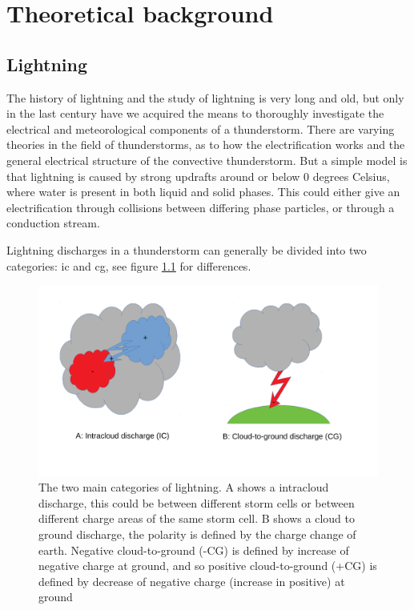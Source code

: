 \setcounter{chapter}{1} 

\chapter{Theoretical background}

\section{Lightning}
The history of lightning and the study of lightning is very long and old, but only in the last century have we acquired the means to thoroughly investigate the electrical and meteorological components of a thunderstorm. There are varying theories in the field of thunderstorms, as to how the electrification works and the general electrical structure of the convective thunderstorm. But a simple model is that lightning is caused by strong updrafts around or below 0 degrees Celsius, where water is present in both liquid and solid phases. This could either give an electrification through collisions between differing phase particles, or through a conduction stream. 

Lightning discharges in a thunderstorm can generally be divided into two categories: \acrfull{ic} and \acrfull{cg}, see figure \ref{fig:lyntyper} for differences.

\begin{figure}
    \centering
    \includegraphics[width=\textwidth]{Figures/lyntyper.pdf}
    \caption{The two main categories of lightning. A shows a intracloud discharge, this could be between different storm cells or between different charge areas of the same storm cell. B shows a cloud to ground discharge, the polarity is defined by the charge change of earth. Negative cloud-to-ground (-CG) is defined by increase of negative charge at ground, and so positive cloud-to-ground (+CG) is defined by decrease of negative charge (increase in positive) at ground}
    \label{fig:lyntyper}
\end{figure}



